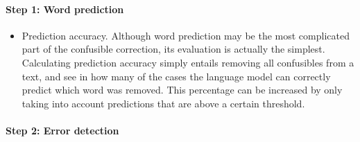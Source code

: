 \documentclass[12pt]{article}
\begin{document}
\paragraph{Step 1: Word prediction}

\begin{itemize}
\item Prediction accuracy. Although word prediction may be the most complicated part of the confusible correction, its evaluation is actually the simplest. Calculating prediction accuracy simply entails removing all confusibles from a text, and see in how many of the cases the language model can correctly predict which word was removed. This percentage can be increased by only taking into account predictions that are above a certain threshold. 
\end{itemize}

\paragraph{Step 2: Error detection}
\end{document}
